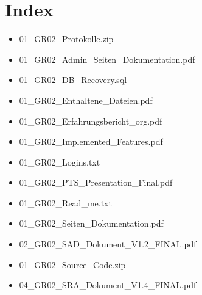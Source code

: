 \documentclass[a4paper,10pt]{scrreprt}
\begin{document}
\section*{Index}

\begin{itemize}
 \item [] 01\_GR02\_Protokolle.zip
 \item [] 01\_GR02\_Admin\_Seiten\_Dokumentation.pdf
 \item [] 01\_GR02\_DB\_Recovery.sql
 \item [] 01\_GR02\_Enthaltene\_Dateien.pdf
 \item [] 01\_GR02\_Erfahrungsbericht\_org.pdf
 \item [] 01\_GR02\_Implemented\_Features.pdf
 \item [] 01\_GR02\_Logins.txt
\item [] 01\_GR02\_PTS\_Presentation\_Final.pdf
 \item [] 01\_GR02\_Read\_me.txt
 \item [] 01\_GR02\_Seiten\_Dokumentation.pdf
 \item [] 02\_GR02\_SAD\_Dokument\_V1.2\_FINAL.pdf
\item [] 01\_GR02\_Source\_Code.zip
 \item [] 04\_GR02\_SRA\_Dokument\_V1.4\_FINAL.pdf
\end{itemize}
\end{document}
